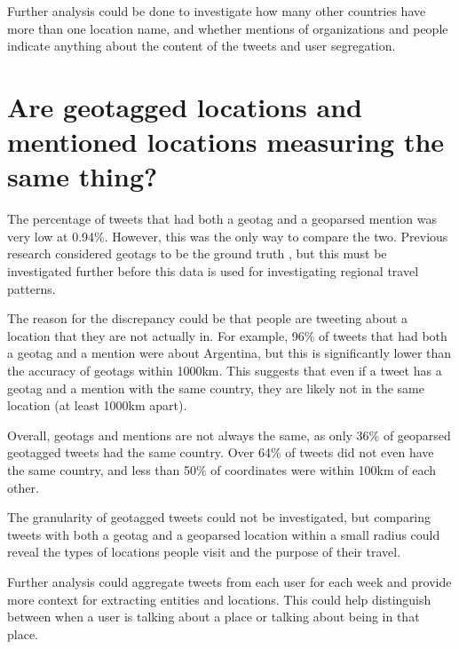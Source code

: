 Further analysis could be done to investigate how many other countries have more than one location name, and whether mentions of organizations and people indicate anything about the content of the tweets and user segregation.

\section{Are geotagged locations and mentioned locations measuring the same thing?}

The percentage of tweets that had both a geotag and a geoparsed mention was very low at 0.94\%. However, this was the only way to compare the two. Previous research considered geotags to be the ground truth \cite{wang_enhancing_2019}, but this must be investigated further before this data is used for investigating regional travel patterns.

The reason for the discrepancy could be that people are tweeting about a location that they are not actually in. For example, 96\% of tweets that had both a geotag and a mention were about Argentina, but this is significantly lower than the accuracy of geotags within 1000km. This suggests that even if a tweet has a geotag and a mention with the same country, they are likely not in the same location (at least 1000km apart).

Overall, geotags and mentions are not always the same, as only 36\% of geoparsed geotagged tweets had the same country. Over 64\% of tweets did not even have the same country, and less than 50\% of coordinates were within 100km of each other.

The granularity of geotagged tweets could not be investigated, but comparing tweets with both a geotag and a geoparsed location within a small radius could reveal the types of locations people visit and the purpose of their travel.

Further analysis could aggregate tweets from each user for each week and provide more context for extracting entities and locations. This could help distinguish between when a user is talking about a place or talking about being in that place.


